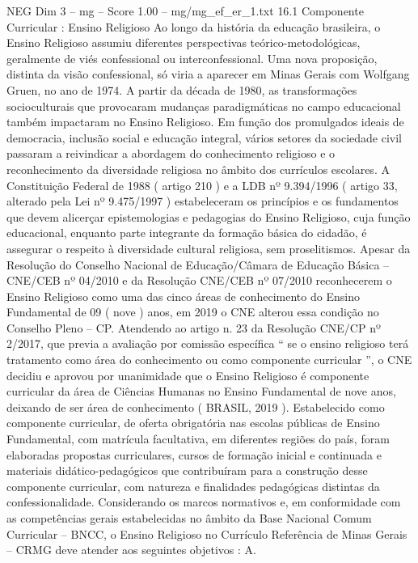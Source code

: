 \begin{textsample}{NEG Dim 3 – mg – Score 1.00 – mg/mg\_ef\_er\_1.txt}  \label{ex:f3_neg_024}
16.1 Componente Curricular : Ensino Religioso Ao longo da história da educação brasileira, o Ensino Religioso assumiu diferentes perspectivas teórico-metodológicas, geralmente de viés confessional ou interconfessional.
Uma nova proposição, distinta da visão confessional, só viria a aparecer em Minas Gerais com Wolfgang Gruen, no ano de 1974.
A partir da década de 1980, as transformações socioculturais que provocaram mudanças paradigmáticas no campo educacional também impactaram no Ensino Religioso.
Em função dos promulgados ideais de democracia, inclusão social e educação integral, vários setores da sociedade civil passaram a reivindicar a abordagem do conhecimento religioso e o reconhecimento da diversidade religiosa no âmbito dos currículos escolares.
A Constituição Federal de 1988 ( artigo 210 ) e a LDB nº 9.394/1996 ( artigo 33, alterado pela Lei nº 9.475/1997 ) estabeleceram os princípios e os fundamentos que devem alicerçar epistemologias e pedagogias do Ensino Religioso, cuja função educacional, enquanto parte integrante da formação básica do cidadão, é assegurar o respeito à diversidade cultural religiosa, sem proselitismos.
Apesar da Resolução do Conselho Nacional de Educação/Câmara de Educação Básica – CNE/CEB nº 04/2010 e da Resolução CNE/CEB nº 07/2010 reconhecerem o Ensino Religioso como uma das cinco áreas de conhecimento do Ensino Fundamental de 09 ( nove ) anos, em 2019 o CNE alterou essa condição no Conselho Pleno – CP.
Atendendo ao artigo n. 23 da Resolução CNE/CP nº 2/2017, que previa a avaliação por comissão específica “ se o ensino religioso terá tratamento como área do conhecimento ou como componente curricular ”, o CNE decidiu e aprovou por unanimidade que o Ensino Religioso é componente curricular da área de Ciências Humanas no Ensino Fundamental de nove anos, deixando de ser área de conhecimento ( BRASIL, 2019 ).
Estabelecido como componente curricular, de oferta obrigatória nas escolas públicas de Ensino Fundamental, com matrícula facultativa, em diferentes regiões do país, foram elaboradas propostas curriculares, cursos de formação inicial e continuada e materiais didático-pedagógicos que contribuíram para a construção desse componente curricular, com natureza e finalidades pedagógicas distintas da confessionalidade.
Considerando os marcos normativos e, em conformidade com as competências gerais estabelecidas no âmbito da Base Nacional Comum Curricular – BNCC, o Ensino Religioso no Currículo Referência de Minas Gerais – CRMG deve atender aos seguintes objetivos : A.

\end{textsample}
